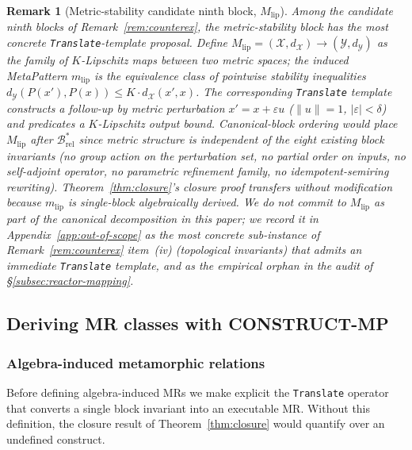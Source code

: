 \documentclass[manuscript]{acmart}
\newtheorem{remark}{Remark}
\begin{document}
\begin{remark}[Metric-stability candidate ninth block, $M_{\mathrm{lip}}$]
\label{rem:metric-stability-block}
Among the candidate ninth blocks of Remark~\ref{rem:counterex}, the metric-stability block has the most concrete \texttt{Translate}-template proposal. Define $M_{\mathrm{lip}} = (\mathcal{X}, d_{\mathcal{X}}) \to (\mathcal{Y}, d_{\mathcal{Y}})$ as the family of $K$-Lipschitz maps between two metric spaces; the induced MetaPattern $m_{\mathrm{lip}}$ is the equivalence class of pointwise stability inequalities $d_{\mathcal{Y}}(P(x'), P(x)) \le K \cdot d_{\mathcal{X}}(x', x)$. The corresponding \texttt{Translate} template constructs a follow-up by metric perturbation $x' = x + \varepsilon u$ ($\|u\| = 1$, $|\varepsilon| < \delta$) and predicates a $K$-Lipschitz output bound. Canonical-block ordering would place $M_{\mathrm{lip}}$ after $\mathcal{B}^{*}_{\mathrm{rel}}$ since metric structure is independent of the eight existing block invariants (no group action on the perturbation set, no partial order on inputs, no self-adjoint operator, no parametric refinement family, no idempotent-semiring rewriting). Theorem~\ref{thm:closure}'s closure proof transfers without modification because $m_{\mathrm{lip}}$ is single-block algebraically derived. We do not commit to $M_{\mathrm{lip}}$ as part of the canonical decomposition in this paper; we record it in Appendix~\ref{app:out-of-scope} as the most concrete sub-instance of Remark~\ref{rem:counterex} item~(iv) (topological invariants) that admits an immediate \texttt{Translate} template, and as the empirical orphan in the audit of \S\ref{subsec:reactor-mapping}.
\end{remark}

\subsection{Deriving MR classes with CONSTRUCT-MP}
\label{sec:framework}

\subsubsection{Algebra-induced metamorphic relations}

Before defining algebra-induced MRs we make explicit the \texttt{Translate} operator that converts a single block invariant into an executable MR. Without this definition, the closure result of Theorem~\ref{thm:closure} would quantify over an undefined construct.
\end{document}
